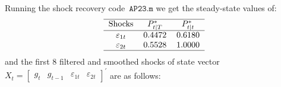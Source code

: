 \documentclass[a4paper,12pt]{article}
\begin{document}
Running the shock recovery code\ $\mathtt{AP23.m}$ we get the steady-state
values of:%
\begin{equation}
\begin{tabular}{ccc}
\hline
Shocks & $P_{t|T}^{\ast }$ & $P_{t|t}^{\ast }$ \\ \hline
$\varepsilon _{1t}$ & $0.4472$ & $0.6180$ \\ 
$\varepsilon _{2t}$ & $0.5528$ & $1.0000$ \\ \hline
\end{tabular}
\label{Pstar0}
\end{equation}%
and the first 8 filtered and smoothed shocks of state vector $X_{t}=%
\begin{bmatrix}
g_{t} & g_{t-1} & \varepsilon _{1t} & \varepsilon _{2t}%
\end{bmatrix}%
^{\prime }$ are as follows:
\end{document}
